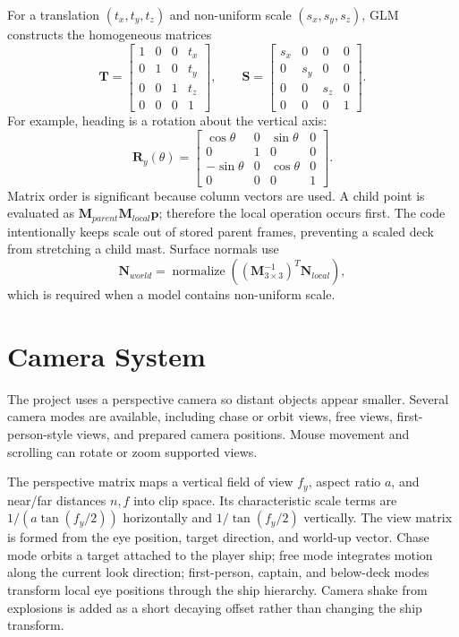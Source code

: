 \documentclass[12pt,a4paper]{report}
\begin{document}
For a translation \((t_x,t_y,t_z)\) and non-uniform scale \((s_x,s_y,s_z)\), GLM constructs the homogeneous matrices
\begin{equation}
\mathbf{T}=\begin{bmatrix}1&0&0&t_x\\0&1&0&t_y\\0&0&1&t_z\\0&0&0&1\end{bmatrix},\qquad
\mathbf{S}=\begin{bmatrix}s_x&0&0&0\\0&s_y&0&0\\0&0&s_z&0\\0&0&0&1\end{bmatrix}.
\end{equation}
For example, heading is a rotation about the vertical axis:
\begin{equation}
\mathbf{R}_y(\theta)=\begin{bmatrix}
\cos\theta&0&\sin\theta&0\\0&1&0&0\\-\sin\theta&0&\cos\theta&0\\0&0&0&1
\end{bmatrix}.
\end{equation}
Matrix order is significant because column vectors are used. A child point is evaluated as \(\mathbf{M}_{parent}\mathbf{M}_{local}\mathbf{p}\); therefore the local operation occurs first. The code intentionally keeps scale out of stored parent frames, preventing a scaled deck from stretching a child mast. Surface normals use
\begin{equation}
\mathbf{N}_{world}=\operatorname{normalize}\!\left((\mathbf{M}_{3\times3}^{-1})^{T}\mathbf{N}_{local}\right),
\end{equation}
which is required when a model contains non-uniform scale.

\section{Camera System}
The project uses a perspective camera so distant objects appear smaller. Several camera modes are available, including chase or orbit views, free views, first-person-style views, and prepared camera positions. Mouse movement and scrolling can rotate or zoom supported views.

The perspective matrix maps a vertical field of view \(f_y\), aspect ratio \(a\), and near/far distances \(n,f\) into clip space. Its characteristic scale terms are \(1/(a\tan(f_y/2))\) horizontally and \(1/\tan(f_y/2)\) vertically. The view matrix is formed from the eye position, target direction, and world-up vector. Chase mode orbits a target attached to the player ship; free mode integrates motion along the current look direction; first-person, captain, and below-deck modes transform local eye positions through the ship hierarchy. Camera shake from explosions is added as a short decaying offset rather than changing the ship transform.
\end{document}
